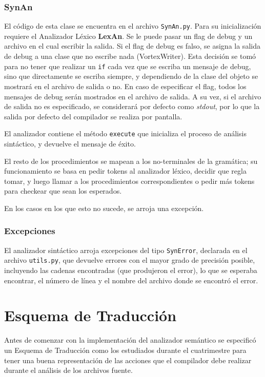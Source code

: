 \documentclass[a4paper,oneside]{report}
\begin{document}
\subsection{SynAn}
El código de esta clase se encuentra en el archivo \verb|SynAn.py|. Para su inicialización requiere el Analizador Léxico \textbf{LexAn}. Se le puede pasar un flag de debug y un archivo en el cual escribir la salida. Si el flag de debug es falso, se asigna la salida de debug a una clase que no escribe nada (VortexWriter). Esta decisión se tomó para no tener que realizar un \texttt{if} cada vez que se escriba un mensaje de debug, sino que directamente se escriba siempre, y dependiendo de la clase del objeto se mostrará en el archivo de salida o no. En caso de especificar el flag, todos los mensajes de debug serán mostrados en el archivo de salida. A su vez, si el archivo de salida no es especificado, se considerará por defecto como \textit{stdout}, por lo que la salida por defecto del compilador se realiza por pantalla.

El analizador contiene el método \verb|execute| que inicializa el proceso de análisis sintáctico, y devuelve el mensaje de éxito.

El resto de los procedimientos se mapean a los no-terminales de la gramática; su funcionamiento se basa en pedir tokens al analizador léxico, decidir que regla tomar, y luego llamar a los procedimientos correspondientes o pedir más tokens para checkear que sean los esperados.

En los casos en los que esto no sucede, se arroja una excepción.

\subsection{Excepciones}

El analizador sintáctico arroja excepciones del tipo \verb|SynError|, declarada en el archivo \verb|utils.py|, que devuelve errores con el mayor grado de precisión posible, incluyendo las cadenas encontradas (que produjeron el error), lo que se esperaba encontrar, el número de línea y el nombre del archivo donde se encontró el error.


\chapter{Esquema de Traducción}

Antes de comenzar con la implementación del analizador semántico se especificó un Esquema de Traducción como los estudiados durante el cuatrimestre para tener una buena representación de las acciones que el compilador debe realizar durante el análisis de los archivos fuente.
\end{document}

